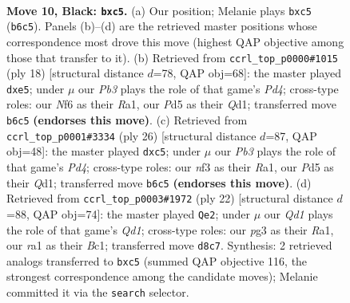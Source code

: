 \documentclass[11pt]{article}
\begin{document}
\begin{figure}[p]\centering
\begin{subfigure}{0.46\textwidth}\centering
\resizebox{\linewidth}{!}{%
\newchessgame
\chessboard[
  setfen={r1bq1rk1/p2n1ppp/1p2pn2/2Pp4/8/2PBPNP1/PP4PP/RN1Q1RK1 b - - 0 10},
  showmover=false,
  pgfstyle=straightmove, color=movearrow, markmove={b6-c5}
]}
\caption{}
\end{subfigure}\hfill
\begin{subfigure}{0.46\textwidth}\centering
\resizebox{\linewidth}{!}{%
\newchessgame
\chessboard[
  setfen={rnb1qrk1/ppp3pp/3p1n2/4pp2/1PPP4/5NP1/P2NPPBP/R2Q1RK1 w - - 0 10},
  showmover=false,
  pgfstyle=straightmove, color=movearrow, markmove={d4-e5}
]}
\caption{}
\end{subfigure}
\\[4pt]
\begin{subfigure}{0.46\textwidth}\centering
\resizebox{\linewidth}{!}{%
\newchessgame
\chessboard[
  setfen={rn3rk1/pb1qbppp/4p3/2pnP3/3P4/P2B1N2/3N1PPP/R1BQ1RK1 w - - 0 14},
  showmover=false,
  pgfstyle=straightmove, color=movearrow, markmove={d4-c5}
]}
\caption{}
\end{subfigure}\hfill
\begin{subfigure}{0.46\textwidth}\centering
\resizebox{\linewidth}{!}{%
\newchessgame
\chessboard[
  setfen={r2qk2r/pp1nbppp/4pn2/2p5/2PP4/1N3N2/PP3PPP/R1BQ1RK1 w kq - 3 12},
  showmover=false,
  pgfstyle=straightmove, color=movearrow, markmove={d1-e2}
]}
\caption{}
\end{subfigure}
\caption{\textbf{Move 10, Black: \texttt{bxc5}.} (a) Our position; Melanie plays \texttt{bxc5} (\texttt{b6c5}). Panels (b)--(d) are the retrieved master positions whose correspondence most drove this move (highest QAP objective among those that transfer to it). (b) Retrieved from \texttt{ccrl\_top\_p0000\#1015} (ply 18) [structural distance $d$=78, QAP obj=68]: the master played \texttt{dxe5}; under $\mu$ our \emph{Pb3} plays the role of that game's \emph{Pd4}; cross-type roles: our \emph{N}f6 as their \emph{R}a1, our \emph{P}d5 as their \emph{Q}d1; transferred move \texttt{b6c5} \textbf{(endorses this move)}. (c) Retrieved from \texttt{ccrl\_top\_p0001\#3334} (ply 26) [structural distance $d$=87, QAP obj=48]: the master played \texttt{dxc5}; under $\mu$ our \emph{Pb3} plays the role of that game's \emph{Pd4}; cross-type roles: our \emph{n}f3 as their \emph{R}a1, our \emph{P}d5 as their \emph{Q}d1; transferred move \texttt{b6c5} \textbf{(endorses this move)}. (d) Retrieved from \texttt{ccrl\_top\_p0003\#1972} (ply 22) [structural distance $d$=88, QAP obj=74]: the master played \texttt{Qe2}; under $\mu$ our \emph{Qd1} plays the role of that game's \emph{Qd1}; cross-type roles: our \emph{p}g3 as their \emph{R}a1, our \emph{r}a1 as their \emph{B}c1; transferred move \texttt{d8c7}. Synthesis: 2 retrieved analogs transferred to \texttt{bxc5} (summed QAP objective 116, the strongest correspondence among the candidate moves); Melanie committed it via the \texttt{search} selector.}
\label{fig:thought-m19}
\end{figure}
\end{document}
